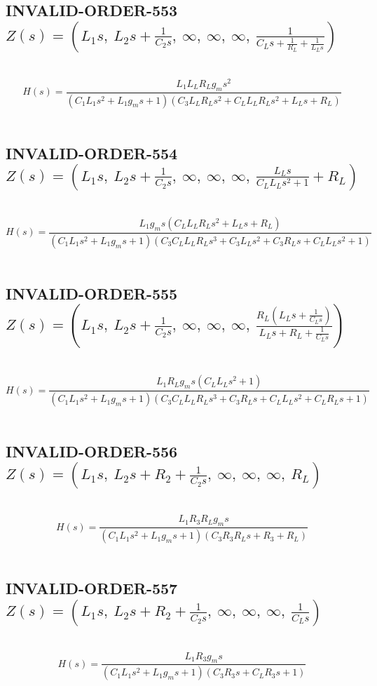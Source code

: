 \documentclass{article}
\begin{document}
\subsection{INVALID-ORDER-553 $Z(s) = \left( L_{1} s, \  L_{2} s + \frac{1}{C_{2} s}, \  \infty, \  \infty, \  \infty, \  \frac{1}{C_{L} s + \frac{1}{R_{L}} + \frac{1}{L_{L} s}}\right)$ } \ 
\textbf{\[H(s) = \frac{L_{1} L_{L} R_{L} g_{m} s^{2}}{\left(C_{1} L_{1} s^{2} + L_{1} g_{m} s + 1\right) \left(C_{3} L_{L} R_{L} s^{2} + C_{L} L_{L} R_{L} s^{2} + L_{L} s + R_{L}\right)}\] } \ 
\subsection{INVALID-ORDER-554 $Z(s) = \left( L_{1} s, \  L_{2} s + \frac{1}{C_{2} s}, \  \infty, \  \infty, \  \infty, \  \frac{L_{L} s}{C_{L} L_{L} s^{2} + 1} + R_{L}\right)$ } \ 
\textbf{\[H(s) = \frac{L_{1} g_{m} s \left(C_{L} L_{L} R_{L} s^{2} + L_{L} s + R_{L}\right)}{\left(C_{1} L_{1} s^{2} + L_{1} g_{m} s + 1\right) \left(C_{3} C_{L} L_{L} R_{L} s^{3} + C_{3} L_{L} s^{2} + C_{3} R_{L} s + C_{L} L_{L} s^{2} + 1\right)}\] } \ 
\subsection{INVALID-ORDER-555 $Z(s) = \left( L_{1} s, \  L_{2} s + \frac{1}{C_{2} s}, \  \infty, \  \infty, \  \infty, \  \frac{R_{L} \left(L_{L} s + \frac{1}{C_{L} s}\right)}{L_{L} s + R_{L} + \frac{1}{C_{L} s}}\right)$ } \ 
\textbf{\[H(s) = \frac{L_{1} R_{L} g_{m} s \left(C_{L} L_{L} s^{2} + 1\right)}{\left(C_{1} L_{1} s^{2} + L_{1} g_{m} s + 1\right) \left(C_{3} C_{L} L_{L} R_{L} s^{3} + C_{3} R_{L} s + C_{L} L_{L} s^{2} + C_{L} R_{L} s + 1\right)}\] } \ 
\subsection{INVALID-ORDER-556 $Z(s) = \left( L_{1} s, \  L_{2} s + R_{2} + \frac{1}{C_{2} s}, \  \infty, \  \infty, \  \infty, \  R_{L}\right)$ } \ 
\textbf{\[H(s) = \frac{L_{1} R_{3} R_{L} g_{m} s}{\left(C_{1} L_{1} s^{2} + L_{1} g_{m} s + 1\right) \left(C_{3} R_{3} R_{L} s + R_{3} + R_{L}\right)}\] } \ 
\subsection{INVALID-ORDER-557 $Z(s) = \left( L_{1} s, \  L_{2} s + R_{2} + \frac{1}{C_{2} s}, \  \infty, \  \infty, \  \infty, \  \frac{1}{C_{L} s}\right)$ } \ 
\textbf{\[H(s) = \frac{L_{1} R_{3} g_{m} s}{\left(C_{1} L_{1} s^{2} + L_{1} g_{m} s + 1\right) \left(C_{3} R_{3} s + C_{L} R_{3} s + 1\right)}\] } \ 
\end{document}
